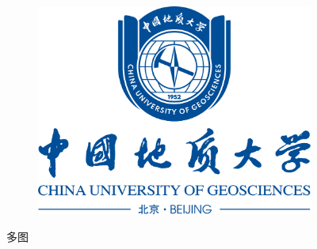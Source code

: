 \documentclass[12pt,a4paper,AutoFakeBold]{ctexart}
\begin{document}
\begin{figure}[H]
\begin{subfigure}{0.3\textwidth}
        \includegraphics[width=\linewidth]{校徽与中英文（蓝色中轴式）.png}
    \end{subfigure}
    \caption{\label{fig:boxr}多图}
\end{figure}
\end{document}
